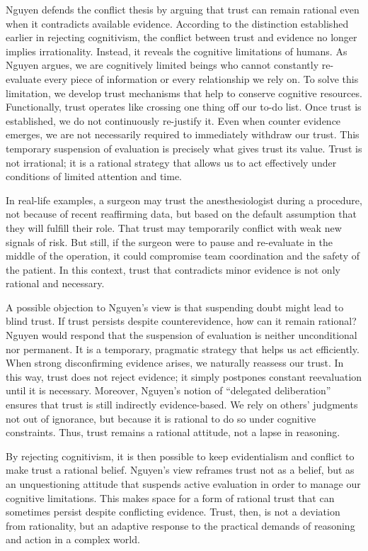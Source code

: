 \documentclass[12pt, a4paper, twoside]{article}
\begin{document}
Nguyen defends the conflict thesis by arguing that trust can remain rational even when it contradicts available evidence. According to the distinction established earlier in rejecting cognitivism, the conflict between trust and evidence no longer implies irrationality. Instead, it reveals the cognitive limitations of humans. As Nguyen argues, we are cognitively limited beings who cannot constantly re-evaluate every piece of information or every relationship we rely on. To solve this limitation, we develop trust mechanisms that help to conserve cognitive resources. Functionally, trust operates like crossing one thing off our to-do list. Once trust is established, we do not continuously re-justify it. Even when counter evidence emerges, we are not necessarily required to immediately withdraw our trust. This temporary suspension of evaluation is precisely what gives trust its value. Trust is not irrational; it is a rational strategy that allows us to act effectively under conditions of limited attention and time.

In real-life examples, a surgeon may trust the anesthesiologist during a procedure, not because of recent reaffirming data, but based on the default assumption that they will fulfill their role. That trust may temporarily conflict with weak new signals of risk. But still, if the surgeon were to pause and re-evaluate in the middle of the operation, it could compromise team coordination and the safety of the patient. In this context, trust that contradicts minor evidence is not only rational and necessary.

A possible objection to Nguyen’s view is that suspending doubt might lead to blind trust. If trust persists despite counterevidence, how can it remain rational? Nguyen would respond that the suspension of evaluation is neither unconditional nor permanent. It is a temporary, pragmatic strategy that helps us act efficiently. When strong disconfirming evidence arises, we naturally reassess our trust. In this way, trust does not reject evidence; it simply postpones constant reevaluation until it is necessary. Moreover, Nguyen’s notion of “delegated deliberation” ensures that trust is still indirectly evidence-based. We rely on others’ judgments not out of ignorance, but because it is rational to do so under cognitive constraints. Thus, trust remains a rational attitude, not a lapse in reasoning.

By rejecting cognitivism, it is then possible to keep evidentialism and conflict to make trust a rational belief. Nguyen’s view reframes trust not as a belief, but as an unquestioning attitude that suspends active evaluation in order to manage our cognitive limitations. This makes space for a form of rational trust that can sometimes persist despite conflicting evidence. Trust, then, is not a deviation from rationality, but an adaptive response to the practical demands of reasoning and action in a complex world.





\printbibliography
\end{document}
